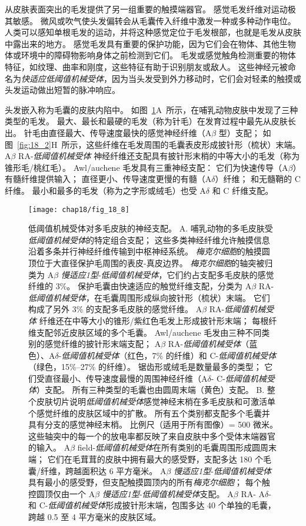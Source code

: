 从皮肤表面突出的毛发提供了另一组重要的触摸端器官。 
感觉毛发纤维对运动极其敏感。
微风或吹气使头发偏转会从毛囊传入纤维中激发一种或多种动作电位。
人类可以感知单根毛发的运动，并将这种感觉定位于毛发根部，也就是毛发从皮肤中露出来的地方。
感觉毛发具有重要的保护功能，因为它们会在物体、其他生物体或环境中的障碍物影响身体之前检测到它们。
毛发或感觉触角检测重要的物体特征，如纹理、曲率和刚度，这些特征有助于识别朋友或敌人。
这些神经元被命名为\textit{快适应低阈值机械受体}，因为当头发受到外力移动时，它们会对轻柔的触摸或头发运动做出短暂的脉冲响应。


头发嵌入称为毛囊的皮肤内陷中。
如图~\ref{fig:18_8}A~所示，在哺乳动物皮肤中发现了三种类型的毛发。
最大、最长和最硬的毛发（称为针毛）在发育过程中最先从皮肤长出。
针毛由直径最大、传导速度最快的感觉神经纤维（A$\beta$ 型）支配；
如图~\ref{fig:18_2}H~所示，这些纤维在毛发周围的毛囊表皮形成披针形（梳状）末端。
A$\beta$ RA-\textit{低阈值机械受体} 神经纤维还支配具有披针形末梢的中等大小的毛发（称为锥形毛/桃红毛）。
Awl/auchene 毛发具有三重神经支配：
它们为快速传导（A$\beta$）有髓纤维提供输入；
直径更小、传导速度更慢的有髓（A$\delta$）纤维；
和无髓鞘的 C 纤维。
最小和最多的毛发（称为之字形或绒毛）也受 A$\delta$ 和 C 纤维支配。


\begin{figure}[htbp]
	\centering
	\texttt{[image: chap18/fig\_18\_8]}
	\caption{低阈值机械受体对多毛皮肤的神经支配。
		A. 哺乳动物的多毛皮肤受\textit{低阈值机械受体}的特定组合支配；
		这些多类神经纤维允许触摸信息沿着多条并行神经纤维传输到中枢神经系统。
		\textit{梅克尔细胞}的触摸圆顶位于大直径保护毛周围的表皮-真皮边界。
		\textit{梅克尔细胞}的轴突被归类为 A$\beta$ \textit{慢适应1型}-\textit{低阈值机械受体}，它们约占支配多毛皮肤的感觉纤维的 3\%。
		保护毛囊由快速适应的触觉纤维支配，分类为 A$\beta$ RA-\textit{低阈值机械受体}，在毛囊周围形成纵向披针形（梳状）末端。
		它们构成了另外 3\% 的支配多毛皮肤的感觉纤维。
		A$\beta$ RA-\textit{低阈值机械受体} 纤维还在中等大小的锥形/紫红色毛发上形成披针形末端； 每根纤维支配邻近皮肤区域的多个毛囊。
		Awl/auchene 毛发由三种不同类别的感觉纤维的披针形末端支配； A$\beta$ RA-\textit{低阈值机械受体}（蓝色）、A$\delta$-\textit{低阈值机械受体}（红色，7\% 的纤维）和 C-\textit{低阈值机械受体}（绿色，15\%–27\% 的纤维）。
		锯齿形或绒毛是数量最多的类型；
		它们受直径最小、传导速度最慢的周围神经纤维（A$\delta$- C-\textit{低阈值机械受体}）支配。 
		所有三种类型的毛囊也由圆周末端（黄色）支配\cite{zimmerman2014gentle}。
		B. 整个皮肤切片说明\textit{低阈值机械受体}感觉神经末梢在多毛皮肤和可激活单个感觉纤维的皮肤区域中的扩散。
		所有五个类别都支配多个毛囊并具有分支的感觉神经末梢。
		比例尺（适用于所有图像）= 500 微米。 
		这些轴突中的每一个的放电率都反映了来自皮肤中多个受体末端器官的输入。
		A$\beta$ field-\textit{低阈值机械受体}在所有类别的毛囊周围形成圆周末端；
		它们在毛茸茸的皮肤中拥有最大的感受野，支配多达 180 个毛囊/纤维，跨越面积达 6 平方毫米。
		A$\beta$ \textit{慢适应1型}-\textit{低阈值机械受体}具有最小的感受野，但支配触摸圆顶内的所有\textit{梅克尔细胞}；
		每个触控圆顶仅由一个 A$\beta$ \textit{慢适应1型}-\textit{低阈值机械受体}支配。
		A$\beta$ RA- A$\delta$- 和 C-\textit{低阈值机械受体}形成披针形末端，包围多达 40 个单独的毛囊，跨越 0.5 至 4 平方毫米的皮肤区域\cite{bai2015genetic}。}
	\label{fig:18_8}
\end{figure}



